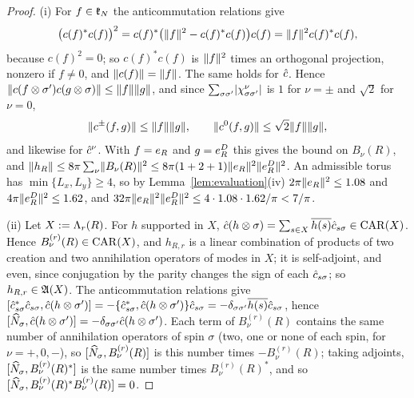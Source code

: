 \begin{proof}
(i) For $f\in\mathfrak{k}_N$ the anticommutation relations give
\[
\bigl(c(f)^*c(f)\bigr)^2=c(f)^*\bigl(\lVert f\rVert^2-c(f)^*c(f)\bigr)c(f)=\lVert f\rVert^2c(f)^*c(f),
\]
because $c(f)^2=0$; so $c(f)^*c(f)$ is $\lVert f\rVert^2$ times an orthogonal projection, nonzero if $f\ne0$, and
$\lVert c(f)\rVert=\lVert f\rVert$. The same holds for $\hat{c}$. Hence $\lVert c(f\otimes\sigma')c(g\otimes\sigma)\rVert\le\lVert f\rVert\lVert g\rVert$, and
since $\sum_{\sigma\sigma'}\lvert\chi^\nu_{\sigma\sigma'}\rvert$ is $1$ for $\nu=\pm$ and $\sqrt2$ for $\nu=0$,
\[
\lVert c^{\pm}(f,g)\rVert\le\lVert f\rVert\lVert g\rVert,\qquad\lVert c^{0}(f,g)\rVert\le\sqrt2\lVert f\rVert\lVert g\rVert,
\]
and likewise for $\hat{c}^{\nu}$. With $f=e_{R}$ and $g=e^{D}_{R}$ this gives the bound on $B_\nu(R)$, and
$\lVert h_R\rVert\le8\pi\sum_\nu\lVert B_\nu(R)\rVert^2\le8\pi(1+2+1)\lVert e_{R}\rVert^2\lVert e^{D}_{R}\rVert^2$. An admissible torus has
$\min\{L_x,L_y\}\ge4$, so by Lemma~\ref{lem:evaluation}(iv) $2\pi\lVert e_{R}\rVert^2\le1.08$ and $4\pi\lVert e^{D}_{R}\rVert^2\le1.62$,
and $32\pi\lVert e_{R}\rVert^2\lVert e^{D}_{R}\rVert^2\le4\cdot1.08\cdot1.62/\pi<7/\pi$.

(ii) Let $X:=\Lambda_{r}(R)$. For $h$ supported in $X$, $\hat{c}(h\otimes\sigma)=\sum_{s\in X}\overline{h(s)}\hat{c}_{s\sigma}\in\mathrm{CAR}(X)$.
Hence $B^{(r)}_\nu(R)\in\mathrm{CAR}(X)$, and $h_{R,r}$ is a linear combination of products of two creation and two
annihilation operators of modes in $X$; it is self-adjoint, and even, since conjugation by the parity changes the
sign of each $\hat{c}_{s\sigma}$; so $h_{R,r}\in\mathfrak{A}(X)$. The anticommutation relations give
$[\hat{c}^*_{s\sigma}\hat{c}_{s\sigma},\hat{c}(h\otimes\sigma')]=-\{\hat{c}^*_{s\sigma},\hat{c}(h\otimes\sigma')\}\hat{c}_{s\sigma}
=-\delta_{\sigma\sigma'}\overline{h(s)}\hat{c}_{s\sigma}$, hence $[\widehat{N}_{\sigma},\hat{c}(h\otimes\sigma')]=-\delta_{\sigma\sigma'}\hat{c}(h\otimes\sigma')$.
Each term of $B^{(r)}_\nu(R)$ contains the same number of annihilation operators of spin $\sigma$ (two, one or none
of each spin, for $\nu=+,0,-$), so $[\widehat{N}_{\sigma},B^{(r)}_\nu(R)]$ is this number times $-B^{(r)}_\nu(R)$; taking
adjoints, $[\widehat{N}_{\sigma},B^{(r)}_\nu(R)^*]$ is the same number times $B^{(r)}_\nu(R)^*$, and so
$[\widehat{N}_{\sigma},B^{(r)}_\nu(R)^*B^{(r)}_\nu(R)]=0$.


\end{proof}
